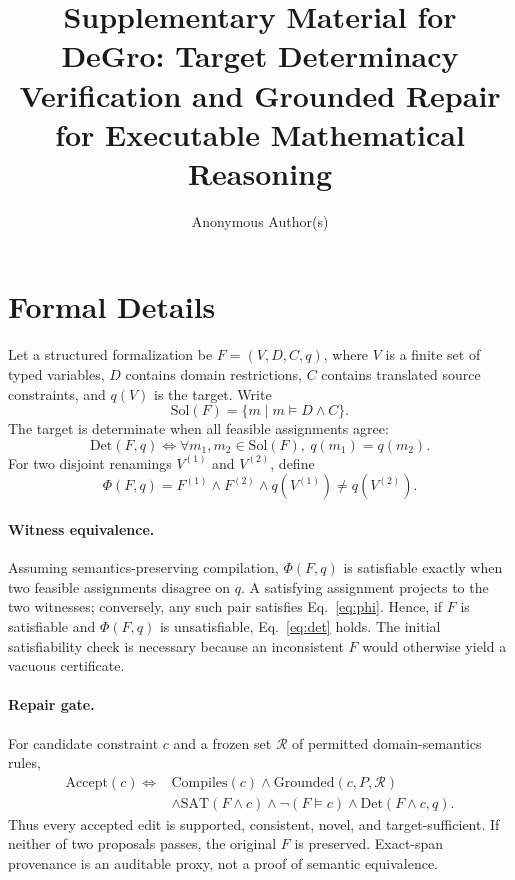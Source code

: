 \documentclass[10pt]{article}
\title{Supplementary Material for\\
\textbf{DeGro: Target Determinacy Verification and Grounded Repair for Executable Mathematical Reasoning}}
\author{Anonymous Author(s)}
\date{}
\begin{document}
\maketitle

\begin{center}
\end{center}

\section{Formal Details}
Let a structured formalization be $F=(V,D,C,q)$, where $V$ is a finite set of typed variables, $D$ contains domain restrictions, $C$ contains translated source constraints, and $q(V)$ is the target. Write
\[
  \mathrm{Sol}(F)=\{m\mid m\models D\land C\}.
\]
The target is determinate when all feasible assignments agree:
\begin{equation}
  \mathrm{Det}(F,q) \iff
  \forall m_1,m_2\in\mathrm{Sol}(F),\ q(m_1)=q(m_2).
  \label{eq:det}
\end{equation}
For two disjoint renamings $V^{(1)}$ and $V^{(2)}$, define
\begin{equation}
  \Phi(F,q)=F^{(1)}\land F^{(2)}\land
  q(V^{(1)})\neq q(V^{(2)}).
  \label{eq:phi}
\end{equation}

\paragraph{Witness equivalence.}
Assuming semantics-preserving compilation, $\Phi(F,q)$ is satisfiable exactly when two feasible assignments disagree on $q$. A satisfying assignment projects to the two witnesses; conversely, any such pair satisfies Eq.~\eqref{eq:phi}. Hence, if $F$ is satisfiable and $\Phi(F,q)$ is unsatisfiable, Eq.~\eqref{eq:det} holds. The initial satisfiability check is necessary because an inconsistent $F$ would otherwise yield a vacuous certificate.

\paragraph{Repair gate.}
For candidate constraint $c$ and a frozen set $\mathcal{R}$ of permitted domain-semantics rules,
\begin{align}
\mathrm{Accept}(c)\iff{}&\mathrm{Compiles}(c)\land
\mathrm{Grounded}(c,P,\mathcal{R})\nonumber\\
&\land\mathrm{SAT}(F\land c)\land\neg(F\models c)
\land\mathrm{Det}(F\land c,q).
\label{eq:accept}
\end{align}
Thus every accepted edit is supported, consistent, novel, and target-sufficient. If neither of two proposals passes, the original $F$ is preserved. Exact-span provenance is an auditable proxy, not a proof of semantic equivalence.
\end{document}
